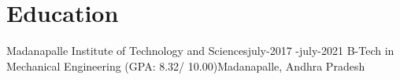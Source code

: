 \section{Education}
    \resumeSubHeadingListStart

    \resumeSubheading
    {Madanapalle Institute of Technology and Sciences}{july-2017 -july-2021}
    {B-Tech in Mechanical Engineering 
    (GPA:  8.32/ 10.00)}{Madanapalle, Andhra Pradesh}
    \resumeSubHeadingListEnd

    